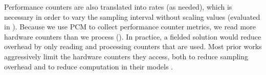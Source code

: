 Performance counters are also translated into rates (as needed), which is necessary in order to vary the sampling interval without scaling values (evaluated in ).
Because we use PCM to collect performance counter metrics, we read more hardware counters than we process ().
In practice, a fielded solution would reduce overhead by only reading and processing counters that are used.
Most prior works aggressively limit the hardware counters they access, both to reduce sampling overhead and to reduce computation in their models \cite{Alvarado,Curtis-Maury2008,Libutti2014}.
